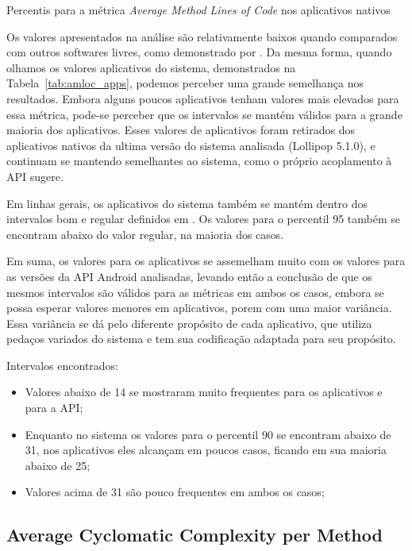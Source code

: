\begin{table}[!htb]

\caption{Percentis para a métrica \textit{Average Method Lines of Code} nos aplicativos nativos}
\label{tab:amloc_apps}
\end{table}

Os valores apresentados na análise são relativamente baixos quando comparados com outros softwares livres, como demonstrado por . Da mesma forma, quando olhamos os valores aplicativos do sistema, demonstrados na Tabela~\ref{tab:amloc_apps}, podemos perceber uma grande semelhança nos resultados. Embora alguns poucos aplicativos tenham valores mais elevados para essa métrica, pode-se perceber que os intervalos se mantém válidos para a grande maioria dos aplicativos. Esses valores de aplicativos foram retirados dos aplicativos nativos da ultima versão do sistema analisada (Lollipop 5.1.0), e continuam se mantendo semelhantes ao sistema, como o próprio acoplamento à API sugere.

Em linhas gerais, os aplicativos do sistema também se mantém dentro dos intervalos bom e regular definidos em . Os valores para o percentil 95 também se encontram abaixo do valor regular, na maioria dos casos.

Em suma, os valores para os aplicativos se assemelham muito com os valores para as versões da API Android analisadas, levando então a conclusão de que os mesmos intervalos são válidos para as métricas em ambos os casos, embora se possa esperar valores menores em aplicativos, porem com uma maior variância. Essa variância se dá pelo diferente propósito de cada aplicativo, que utiliza pedaços variados do sistema e tem sua codificação adaptada para seu propósito.

Intervalos encontrados:

\begin{itemize}
\item Valores abaixo de 14 se mostraram muito frequentes para os aplicativos e para a API;
\item Enquanto no sistema os valores para o percentil 90 se encontram abaixo de 31, nos aplicativos eles alcançam em poucos casos, ficando em sua maioria abaixo de 25;
\item Valores acima de 31 são pouco frequentes em ambos os casos;
\end{itemize}

\subsection{Average Cyclomatic Complexity per Method}

